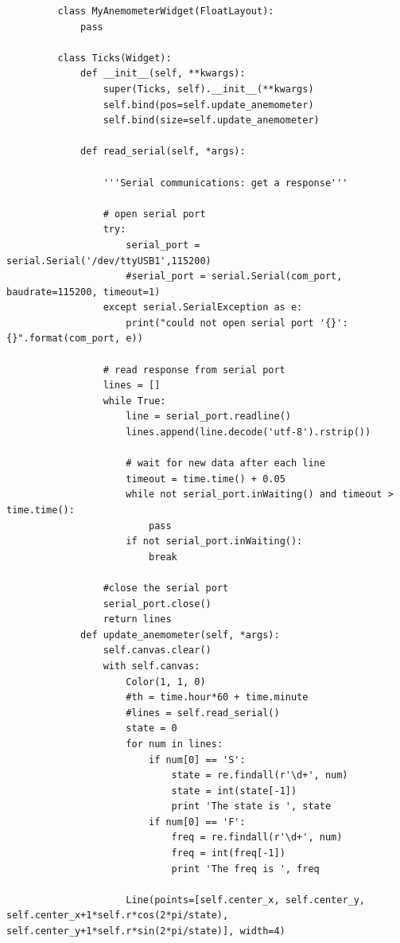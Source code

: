 \documentclass[10pt]{article}
\begin{document}
\begin{itemize}
\begin{verbatim}
         class MyAnemometerWidget(FloatLayout):
             pass

         class Ticks(Widget):
             def __init__(self, **kwargs):
                 super(Ticks, self).__init__(**kwargs)
                 self.bind(pos=self.update_anemometer)
                 self.bind(size=self.update_anemometer)

             def read_serial(self, *args):

                 '''Serial communications: get a response'''

                 # open serial port
                 try:
                     serial_port = serial.Serial('/dev/ttyUSB1',115200)
                     #serial_port = serial.Serial(com_port, baudrate=115200, timeout=1)
                 except serial.SerialException as e:
                     print("could not open serial port '{}': {}".format(com_port, e))

                 # read response from serial port
                 lines = []
                 while True:
                     line = serial_port.readline()
                     lines.append(line.decode('utf-8').rstrip())

                     # wait for new data after each line
                     timeout = time.time() + 0.05
                     while not serial_port.inWaiting() and timeout > time.time():
                         pass
                     if not serial_port.inWaiting():
                         break 

                 #close the serial port
                 serial_port.close()   
                 return lines
             def update_anemometer(self, *args):
                 self.canvas.clear()
                 with self.canvas:
                     Color(1, 1, 0)
                     #th = time.hour*60 + time.minute
                     #lines = self.read_serial()
                     state = 0 
                     for num in lines:
                         if num[0] == 'S':
                             state = re.findall(r'\d+', num)
                             state = int(state[-1])
                             print 'The state is ', state
                         if num[0] == 'F':
                             freq = re.findall(r'\d+', num)
                             freq = int(freq[-1])
                             print 'The freq is ', freq

                     Line(points=[self.center_x, self.center_y, self.center_x+1*self.r*cos(2*pi/state), self.center_y+1*self.r*sin(2*pi/state)], width=4)


\end{verbatim}
\end{itemize}
\end{document}
